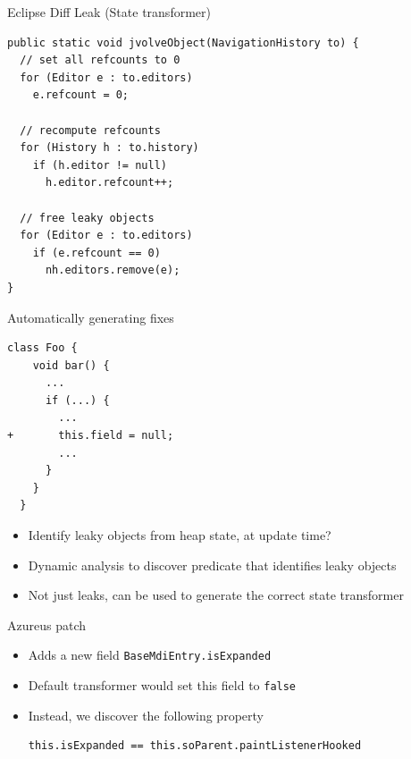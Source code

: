 \begin{frame}[fragile]{Eclipse Diff Leak (State transformer)}%
\begin{lstlisting}[frame=single]
public static void jvolveObject(NavigationHistory to) {
  // set all refcounts to 0
  for (Editor e : to.editors)
    e.refcount = 0;

  // recompute refcounts
  for (History h : to.history)
    if (h.editor != null)
      h.editor.refcount++;

  // free leaky objects
  for (Editor e : to.editors)
    if (e.refcount == 0)
      nh.editors.remove(e);
}
\end{lstlisting}
\end{frame}

\begin{frame}[fragile]{Automatically generating fixes}%
\begin{center}
\begin{minipage}{0.55\textwidth}
\begin{lstlisting}[frame=single]
  class Foo {
    void bar() {
      ...
      if (...) {
        ...
+       this.field = null;
        ...
      }
    }
  }
  \end{lstlisting}
\end{minipage}
\end{center}
\begin{itemize}
\item Identify leaky objects from heap state, at update time?
\item Dynamic analysis to discover predicate that identifies leaky objects
\item Not just leaks, can be used to generate the correct state transformer
\end{itemize}
\end{frame}

\begin{frame}[fragile]{Azureus patch}%
\begin{itemize}
\item Adds a new field {\tt BaseMdiEntry.isExpanded}
\item Default transformer would set this field to {\tt false}
\item Instead, we discover the following property
\begin{lstlisting}[numbers=none]
this.isExpanded == this.soParent.paintListenerHooked
\end{lstlisting}
\end{itemize}
\end{frame}
